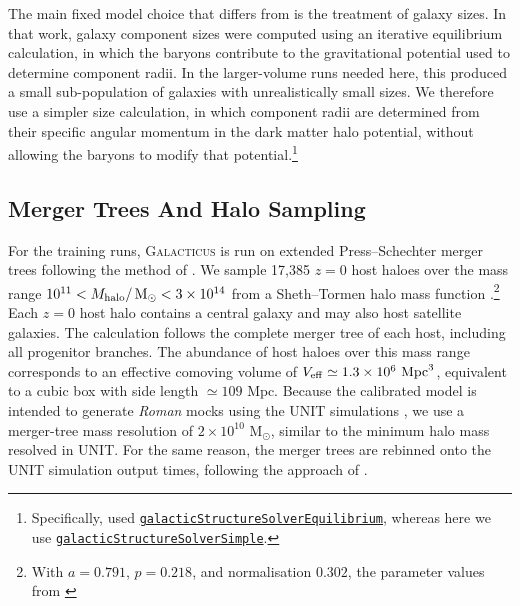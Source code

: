 \documentclass[twocolumn, apj, numberedappendix, iop]{openjournal}
\newcommand{\galacticus}{\textsc{Galacticus}\xspace}
\newcommand{\romanspace}{\textit{Roman}\xspace}
\def\mpc{\mathrm{\, Mpc}}
\def\msun{\mathrm{\, M_\odot}}
\begin{document}
The main fixed model choice that differs from \citet{2026OJAp....955306R} is the treatment of galaxy sizes.
In that work, galaxy component sizes were computed using an iterative equilibrium calculation, in which the baryons contribute to the gravitational potential used to determine component radii.
In the larger-volume runs needed here, this produced a small sub-population of galaxies with unrealistically small sizes. %
We therefore use a simpler size calculation, in which component radii are determined from their specific angular momentum in the dark matter halo potential, without allowing the baryons to modify that potential.\footnote{Specifically, \citet{2026OJAp....955306R} used
\href{https://galacticus.readthedocs.io/en/v0.9.12/physics/galacticStructureSolver.html\#galacticstructuresolverequilibrium}{\texttt{galacticStructureSolverEquilibrium}},
whereas here we use
\href{https://galacticus.readthedocs.io/en/v0.9.12/physics/galacticStructureSolver.html\#galacticstructuresolversimple}{\texttt{galacticStructureSolverSimple}}.}

\subsection{Merger Trees And Halo Sampling}
\label{sec:tree-sampling}

For the training runs, \galacticus{} is run on extended Press--Schechter
merger trees following the
method of \citet{2008MNRAS.383..557P}. We sample 17,385 $z=0$ host haloes over the mass range
$10^{11}<M_{\rm halo}/\msun<3\times10^{14}$ from a Sheth--Tormen halo mass
function \citep{1999MNRAS.308..119S}.\footnote{With $a=0.791$, $p=0.218$, and
normalisation $0.302$, the parameter values from \citet{2019MNRAS.485.5010B}}
Each $z=0$ host halo contains a central galaxy and may also host satellite
galaxies. The calculation follows the complete merger tree of each host,
including all progenitor branches.
The abundance of host haloes over this mass range corresponds to an effective comoving volume of $V_{\rm eff}\simeq 1.3\times10^6\,\mpc^3$, equivalent to a cubic box with side length $\simeq 109\,\mpc$.
Because the calibrated model is intended to generate \romanspace{}  mocks using the UNIT simulations \citep{2019MNRAS.487...48C}, we use a merger-tree mass resolution of $2\times10^{10}\,\msun$, similar to the minimum halo mass resolved in UNIT.
For the same reason, the merger trees are rebinned onto the UNIT simulation output times, following the approach of \citet{2012MNRAS.419.3590B}.
\end{document}
